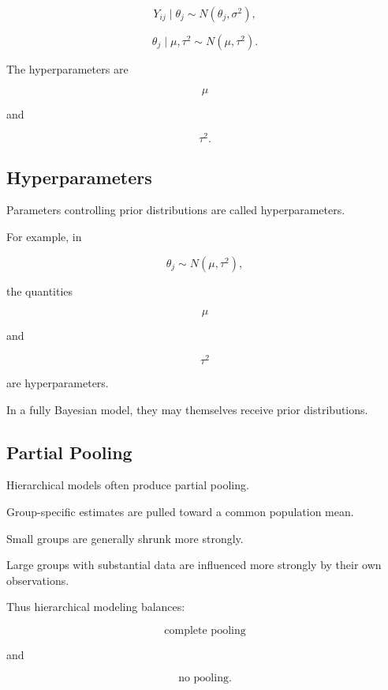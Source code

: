 \[
\boxed{
Y_{ij}
\mid
\theta_j
\sim
N(\theta_j,\sigma^2),
}
\]

\[
\boxed{
\theta_j
\mid
\mu,\tau^2
\sim
N(\mu,\tau^2).
}
\]

The hyperparameters are

\[
\mu
\]

and

\[
\tau^2.
\]

\subsection{Hyperparameters}
\label{subsec:hyperparameters}

Parameters controlling prior distributions are called hyperparameters.

For example, in

\[
\theta_j
\sim
N(\mu,\tau^2),
\]

the quantities

\[
\boxed{
\mu
}
\]

and

\[
\boxed{
\tau^2
}
\]

are hyperparameters.

In a fully Bayesian model, they may themselves receive prior
distributions.

\subsection{Partial Pooling}
\label{subsec:partial-pooling}

Hierarchical models often produce partial pooling.

Group-specific estimates are pulled toward a common population mean.

Small groups are generally shrunk more strongly.

Large groups with substantial data are influenced more strongly by their
own observations.

Thus hierarchical modeling balances:

\[
\boxed{
\text{complete pooling}
}
\]

and

\[
\boxed{
\text{no pooling}.
}
\]

